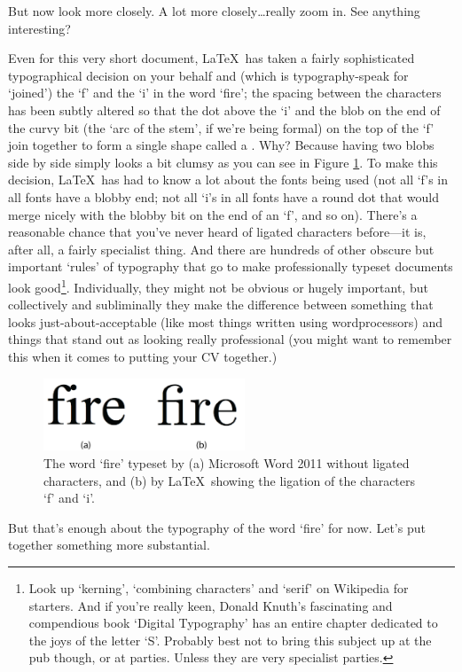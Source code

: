 \begin{refsection}
But now look more closely. A lot more closely\ldots really zoom in. See anything interesting?

Even for this very short document, \LaTeX\ has taken a fairly sophisticated typographical decision on your behalf and  (which is typo\-graphy-speak for `joined') the `f' and the `i' in the word `fire'; the spacing between the characters has been subtly altered so that the dot above the `i' and the blob on the end of the curvy bit (the `arc of the stem', if we're being formal) on the top of the `f' join together to form a single shape called a . Why? Because having two blobs side by side simply looks a bit clumsy as you can see in Figure \ref{figure:twofires}. To make this decision, \LaTeX\ has had to know a lot about the fonts being used (not all `f's in all fonts have a blobby end; not all `i's in all fonts have a round dot that would merge nicely with the blobby bit on the end of an `f', and so on). There's a reasonable chance that you've never heard of ligated characters before---it is, after all, a fairly specialist thing. And there are hundreds of other obscure but important `rules' of typography that go to make professionally typeset documents look good\footnote{Look up `kerning', `combining characters' and `serif' on Wikipedia for starters. And if you're really keen, Donald Knuth's fascinating and compendious book `Digital Typography' \citep{knuth1999} has an entire chapter dedicated to the joys of the letter `S'. Probably best not to bring this subject up at the pub though, or at parties. Unless they are very specialist parties.}. Individually, they might not be obvious or hugely important, but collectively and subliminally they make the difference between something that looks just-about-acceptable (like most things written using wordprocessors) and things that stand out as looking really professional (you might want to remember this when it comes to putting your CV together.)

\begin{figure}[htbp]
\centerline{\includegraphics[width=6cm]{images/fireandfire.png}}
\caption{The word `fire' typeset by (a) Microsoft Word 2011 without ligated characters, and (b) by \LaTeX\ showing the ligation of the characters `f' and `i'.}\label{figure:twofires}
\end{figure}
%
But that's enough about the typography of the word `fire' for now. Let's put together something more substantial. 


\end{refsection}
